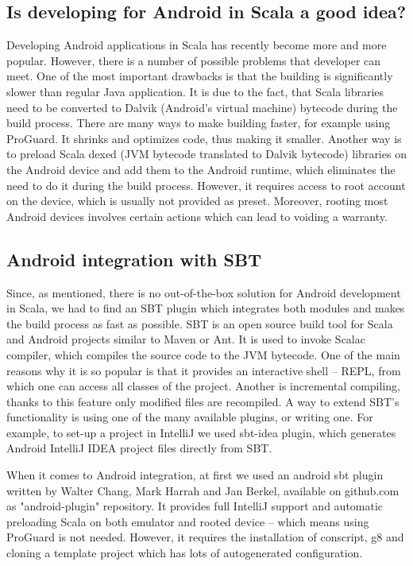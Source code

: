 \subsection{Is developing for Android in Scala a good idea?}
\label{subsec:good-idea}
Developing Android applications in Scala has recently become more and more popular. However, there is a number of possible problems that developer can meet. One of the most important drawbacks is that the building is significantly slower than regular Java application. It is due to the fact, that Scala libraries need to be converted to Dalvik (Android's virtual machine) bytecode during the build process. There are many ways to make building faster, for example using ProGuard. It shrinks and optimizes code, thus making it smaller\cite{Berkel:2011:preinstall}. Another way is to preload Scala dexed (JVM bytecode translated to Dalvik bytecode) libraries on the Android device and add them to the Android runtime, which eliminates the need to do it during the build process\cite{Berkel:2011:preinstall}. However, it requires access to root account on the device, which is usually not provided as preset. Moreover, rooting most Android devices involves certain actions which can lead to voiding a warranty. 

\subsection{Android integration with SBT}
\label{subsec:choosing-ide}
Since, as mentioned, there is no out-of-the-box solution for Android development in Scala, we had to find an SBT plugin which integrates both modules and makes the build process as fast as possible. SBT is an open source build tool for Scala and Android projects similar to Maven or Ant. It is used to invoke Scalac compiler, which compiles the source code to the JVM bytecode. One of the main reasons why it is so popular is that it provides an interactive shell -- REPL, from which one can access all classes of the project. Another is incremental compiling, thanks to this feature only modified files are recompiled\cite{Fatin:2012:NewWay}. A way to extend SBT's functionality is using one of the many available plugins, or writing one. For example, to set-up a project in IntelliJ  we used sbt-idea plugin, which generates Android IntelliJ IDEA project files directly from SBT.

When it comes to Android integration, at first we used an android sbt plugin written by Walter Chang, Mark Harrah and Jan Berkel, available on github.com as "android-plugin" repository. It provides full IntelliJ support and automatic preloading Scala on both emulator and rooted device -- which means using ProGuard is not needed. However, it requires the installation of conscript, g8 and cloning a template project which has lots of autogenerated configuration\cite{Nguyen:2013:differences}. 	

